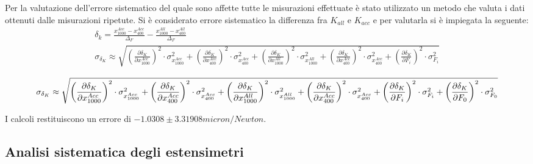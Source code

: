 \documentclass[a4paper,11pt,oneside]{article}
\begin{document}
Per la valutazione dell'errore sistematico del quale sono affette tutte le misurazioni effettuate è stato utilizzato un metodo che valuta i dati ottenuti dalle misurazioni ripetute. Si è considerato errore sistematico la differenza fra $K_{all}$ e $K_{acc}$ e per valutarla si è impiegata la seguente:
\begin{gather*}
    
    \delta_{k} = \frac{x^{Acc}_{1000}-x^{Acc}_{400}}{\Delta_F}-\frac{x^{All}_{1000}-x^{All}_{400}}{\Delta_F} \\
    
    
    \sigma_{\delta_K}\approx \sqrt{
\left ( \frac{\partial \delta_K }{\partial x^{Acc}_{1000}} \right )^2\cdot  \sigma_{x^{Acc}_{1000}} ^2+
\left ( \frac{\partial \delta_K}{\partial x^{Acc}_{400}} \right )^2\cdot  \sigma_{x^{Acc}_{400}} ^2+
\left ( \frac{\partial \delta_K }{\partial x^{All}_{1000}} \right )^2\cdot  \sigma_{x^{All}_{1000}} ^2+
\left ( \frac{\partial \delta_K }{\partial x^{Acc}_{400}} \right )^2\cdot  \sigma_{x^{Acc}_{400}} ^2+
\left ( \frac{\partial \delta_K}{\partial F_i} \right )^2\cdot  \sigma_{F_i} ^2}
\end{gather*}

\begin{equation*}
\small \sigma_{\delta_K}\approx \sqrt{ \left ( \frac{\partial \delta_K }{\partial x^{Acc}_{1000}} \right )^2\cdot \sigma_{x^{Acc}_{1000}} ^2+ \left ( \frac{\partial \delta_K}{\partial x^{Acc}_{400}} \right )^2\cdot \sigma_{x^{Acc}_{400}} ^2+ \left ( \frac{\partial \delta_K }{\partial x^{All}_{1000}} \right )^2\cdot \sigma_{x^{All}_{1000}} ^2+ \left ( \frac{\partial \delta_K }{\partial x^{Acc}_{400}} \right )^2\cdot \sigma_{x^{Acc}_{400}} ^2+ \left ( \frac{\partial \delta_K}{\partial F_i} \right )^2\cdot \sigma_{F_i} ^2+ \left ( \frac{\partial \delta_K }{\partial F_0} \right )^2\cdot \sigma_{F_0} ^2 }
\end{equation*}

I calcoli restituiscono un errore di $-1.0308 \pm 3.31908 micron/Newton$. 



\subsection{Analisi sistematica degli estensimetri}
\end{document}
